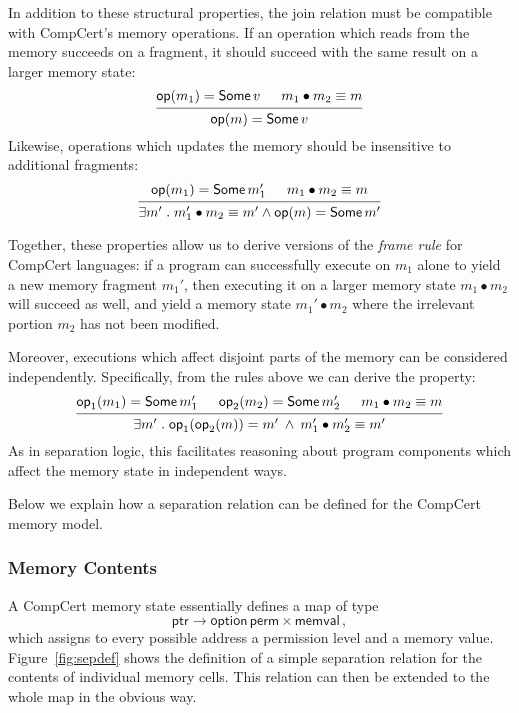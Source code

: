 \documentclass[acmsmall,screen,review,anonymous,nonacm]{acmart}
\newcommand{\kw}[1]{\ensuremath{ \mathsf{#1} }}
\begin{document}
In addition to these structural properties,
the join relation must be compatible
with CompCert's memory operations.
If an operation which reads from the memory succeeds on a fragment,
it should succeed with the same result on a larger memory state:
\[
  \begin{prooftree}
    \hypo{\kw{op}(m_1) = \kw{Some}\,v}
    \hypo{m_1 \bullet m_2 \equiv m}
    \infer2{\kw{op}(m) = \kw{Some}\,v}
  \end{prooftree}
\]
Likewise,
operations which updates the memory
should be insensitive to additional fragments:
\[
  \begin{prooftree}
    \hypo{\kw{op}(m_1) = \kw{Some}\,m_1'}
    \hypo{m_1 \bullet m_2 \equiv m}
    \infer2{\exists m' \mathrel.
      m_1' \bullet m_2 \equiv m' \wedge
      \kw{op}(m) = \kw{Some}\,m'}
  \end{prooftree}
\]

Together,
these properties allow us to derive
versions of the \emph{frame rule}
for CompCert languages:
if a program can successfully execute on $m_1$ alone
to yield a new memory fragment $m_1'$,
then executing it on a larger memory state
$m_1 \bullet m_2$ will succeed as well,
and yield a memory state $m_1' \bullet m_2$
where the irrelevant portion $m_2$
has not been modified.

Moreover,
executions which affect disjoint parts of the memory
can be considered independently.
Specifically, from the rules above
we can derive the property:
\[
  \begin{prooftree}
    \hypo{\kw{op}_1(m_1) = \kw{Some}\,m_1'}
    \hypo{\kw{op}_2(m_2) = \kw{Some}\,m_2'}
    \hypo{m_1 \bullet m_2 \equiv m}
    \infer3{\exists m' \mathrel.
      \kw{op}_1(\kw{op}_2(m)) =
	m' \:\wedge\:
      m_1' \bullet m_2' \equiv m'}
  \end{prooftree}
\]
As in separation logic,
this facilitates reasoning
about program components
which affect the memory state in independent ways.

Below we explain how a separation relation can be defined
for the CompCert memory model.

\subsubsection{Memory Contents}

A CompCert memory state essentially defines a map of type
\[
  \kw{ptr} \rightarrow \kw{option}\,\kw{perm} \times \kw{memval} \,,
\]
which assigns to every possible address
a permission level and a memory value.
Figure~\ref{fig:sepdef}
shows the definition of a simple separation relation
for the contents of individual memory cells.
This relation can then be extended to the whole map
in the obvious way.
\end{document}

